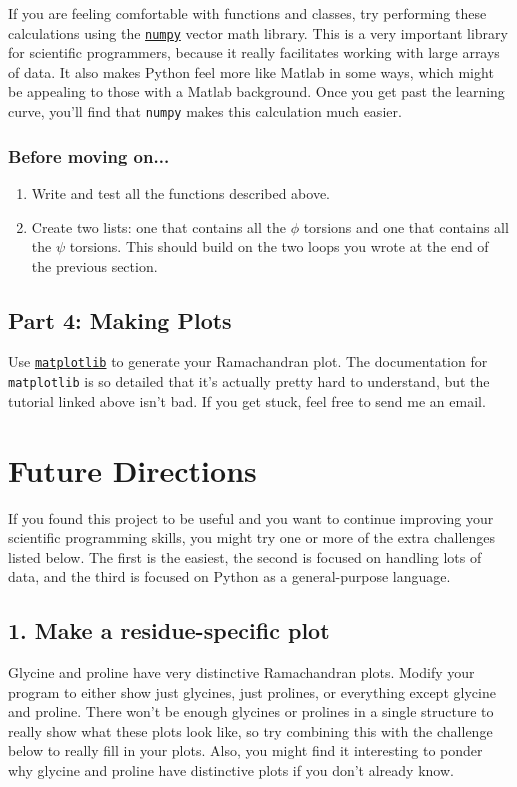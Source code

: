\documentclass{article}
\newcommand{\bbphi}{\ensuremath{\phi}}
\newcommand{\bbpsi}{\ensuremath{\psi}}
\newcommand{\module}[2]{\href{#2}{\texttt{#1}}}
\newenvironment{problems}
{\subsubsection{Before moving on...} \begin{enumerate}}
{\end{enumerate}}
\begin{document}
If you are feeling comfortable with functions and classes, try performing these 
calculations using the 
\module{numpy}{http://wiki.scipy.org/Tentative_NumPy_Tutorial} vector math 
library.  This is a very important library for scientific programmers, because 
it really facilitates working with large arrays of data.  It also makes Python 
feel more like Matlab in some ways, which might be appealing to those with a 
Matlab background.  Once you get past the learning curve, you'll find that 
\texttt{numpy} makes this calculation much easier.

\begin{problems}
 \item Write and test all the functions described above.
 \item Create two lists: one that contains all the \bbphi{} torsions and one 
  that contains all the \bbpsi{} torsions.  This should build on the two loops 
  you wrote at the end of the previous section.
\end{problems}

\subsection{Part 4: Making Plots}

Use \module{matplotlib}{http://matplotlib.org/users/pyplot_tutorial.html} to 
generate your Ramachandran plot.  The documentation for \texttt{matplotlib} is 
so detailed that it's actually pretty hard to understand, but the tutorial 
linked above isn't bad.  If you get stuck, feel free to send me an email.

\pagebreak

\section{Future Directions}

If you found this project to be useful and you want to continue improving your 
scientific programming skills, you might try one or more of the extra 
challenges listed below.  The first is the easiest, the second is focused on 
handling lots of data, and the third is focused on Python as a general-purpose 
language.

\subsection{1. Make a residue-specific plot}

Glycine and proline have very distinctive Ramachandran plots.  Modify your 
program to either show just glycines, just prolines, or everything except 
glycine and proline.  There won't be enough glycines or prolines in a single 
structure to really show what these plots look like, so try combining this with 
the challenge below to really fill in your plots.  Also, you might find it 
interesting to ponder why glycine and proline have distinctive plots if you 
don't already know.
\end{document}

